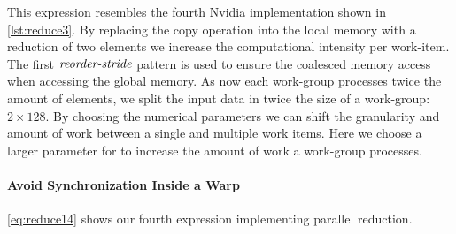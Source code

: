 %
This expression resembles the fourth Nvidia implementation shown in \autoref{lst:reduce3}.
By replacing the copy operation into the local memory with a reduction of two elements we increase the computational intensity per work-item.
The first $\text{\textit{reorder-stride}}$ pattern is used to ensure the coalesced memory access when accessing the global memory.
As now each work-group processes twice the amount of elements, we split the input data in twice the size of a work-group: $2\times 128$.
By choosing the numerical parameters we can shift the granularity and amount of work between a single and multiple work items.
Here we choose a larger parameter for \splitN to increase the amount of work a work-group processes.

\paragraph{Avoid Synchronization Inside a Warp}
\autoref{eq:reduce14} shows our fourth expression implementing parallel reduction.
